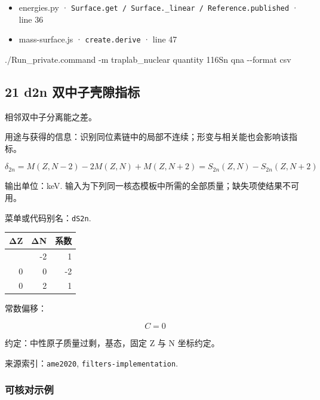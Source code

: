 \documentclass[
  11pt,
  letterpaper,
]{article}
\newenvironment{Shaded}{}{}
\newcommand{\AttributeTok}[1]{\textcolor[rgb]{0.49,0.56,0.16}{#1}}
\newcommand{\ExtensionTok}[1]{#1}
\newcommand{\NormalTok}[1]{#1}
\providecommand{\tightlist}{%
  \setlength{\itemsep}{0pt}\setlength{\parskip}{0pt}}
\begin{document}
\begin{itemize}
\tightlist
\item
  energies.py ·
  \texttt{Surface.get\ /\ Surface.\_linear\ /\ Reference.published} ·
  line 36
\item
  mass-surface.js · \texttt{create.derive} · line 47
\end{itemize}

\begin{Shaded}
\begin{Highlighting}[]
\ExtensionTok{./Run\_private.command} \AttributeTok{{-}m}\NormalTok{ traplab\_nuclear quantity 116Sn qna }\AttributeTok{{-}{-}format}\NormalTok{ csv}
\end{Highlighting}
\end{Shaded}

\subsection{21 d2n
双中子壳隙指标}\label{d2n-ux53ccux4e2dux5b50ux58f3ux9699ux6307ux6807}

相邻双中子分离能之差。

用途与获得的信息：识别同位素链中的局部不连续；形变与相关能也会影响该指标。

\[
\delta_{2n}=M(Z,N-2)-2M(Z,N)+M(Z,N+2)=S_{2n}(Z,N)-S_{2n}(Z,N+2)
\]

输出单位：keV.
输入为下列同一核态模板中所需的全部质量；缺失项使结果不可用。

菜单或代码别名：\texttt{dS2n}.

\begin{longtable}[]{@{}rrr@{}}
\toprule\noalign{}
ΔZ & ΔN & 系数 \\
\midrule\noalign{}
\endhead
\bottomrule\noalign{}
\endlastfoot
0 & -2 & 1 \\
0 & 0 & -2 \\
0 & 2 & 1 \\
\end{longtable}

常数偏移：

\[
C=0
\]

约定：中性原子质量过剩，基态，固定 Z 与 N 坐标约定。

来源索引：\texttt{ame2020}, \texttt{filters-implementation}.

\subsubsection{可核对示例}\label{ux53efux6838ux5bf9ux793aux4f8b-20}
\end{document}
